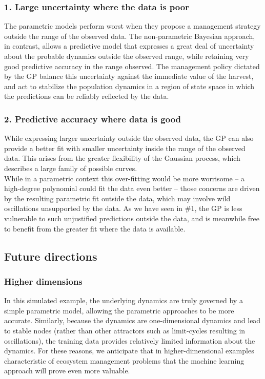 \documentclass[author-year, review]{elsarticle} %
\begin{document}
\subsubsection{1. Large uncertainty where the data is poor}

The parametric models perform worst when they propose a management
strategy outside the range of the observed data. The non-parametric
Bayesian approach, in contrast, allows a predictive model that expresses
a great deal of uncertainty about the probable dynamics outside the
observed range, while retaining very good predictive accuracy in the
range observed. The management policy dictated by the GP balance this
uncertainty against the immediate value of the harvest, and act to
stabilize the population dynamics in a region of state space in which
the predictions can be reliably reflected by the data.

\subsubsection{2. Predictive accuracy where data is good}

While expressing larger uncertainty outside the observed data, the GP
can also provide a better fit with smaller uncertainty inside the range
of the observed data. This arises from the greater flexibility of the
Gaussian process, which describes a large family of possible
curves.\\While in a parametric context this over-fitting would be more
worrisome -- a high-degree polynomial could fit the data even better --
those concerns are driven by the resulting parametric fit outside the
data, which may involve wild oscillations unsupported by the data. As we
have seen in \#1, the GP is less vulnerable to such unjustified
predictions outside the data, and is meanwhile free to benefit from the
greater fit where the data is available.

\subsection{Future directions}

\subsubsection{Higher dimensions}

In this simulated example, the underlying dynamics are truly governed by
a simple parametric model, allowing the parametric approaches to be more
accurate. Similarly, because the dynamics are one-dimensional dynamics
and lead to stable nodes (rather than other attractors such as
limit-cycles resulting in oscillations), the training data provides
relatively limited information about the dynamics. For these reasons, we
anticipate that in higher-dimensional examples characteristic of
ecosystem management problems that the machine learning approach will
prove even more valuable.
\end{document}
